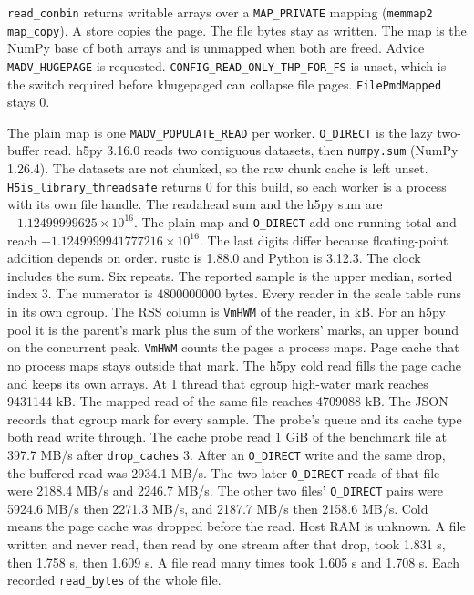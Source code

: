 \texttt{read\_conbin} returns writable arrays over a
\texttt{MAP\_PRIVATE} mapping (\texttt{memmap2} \texttt{map\_copy}).
A store copies the page.
The file bytes stay as written.
The map is the NumPy base of both arrays and is unmapped when both are
freed.
Advice \texttt{MADV\_HUGEPAGE} is requested.
\texttt{CONFIG\_READ\_ONLY\_THP\_FOR\_FS} is unset, which is the switch required before
khugepaged can collapse file pages.
\texttt{FilePmdMapped} stays 0.

The plain map is one \texttt{MADV\_POPULATE\_READ} per worker.
\texttt{O\_DIRECT} is the lazy two-buffer read.
h5py 3.16.0 reads two contiguous datasets, then \texttt{numpy.sum}
(NumPy 1.26.4).
The datasets are not chunked, so the raw chunk cache is left unset.
\texttt{H5is\_library\_threadsafe} returns 0 for this build, so each
worker is a process with its own file handle.
The readahead sum and the h5py sum are
\(-1.12499999625 \times 10^{16}\).
The plain map and \texttt{O\_DIRECT} add one running total and reach
\(-1.1249999941777216 \times 10^{16}\).
The last digits differ because floating-point addition depends on order.
rustc is 1.88.0 and Python is 3.12.3.
The clock includes the sum.
Six repeats.
The reported sample is the upper median, sorted index 3.
The numerator is \(4800000000\) bytes.
Every reader in the scale table runs in its own cgroup.
The RSS column is \texttt{VmHWM} of the reader, in kB.
For an h5py pool it is the parent's mark plus the sum of the workers'
marks, an upper bound on the concurrent peak.
\texttt{VmHWM} counts the pages a process maps.
Page cache that no process maps stays outside that mark.
The h5py cold read fills the page cache and keeps its own arrays.
At 1 thread that cgroup high-water mark reaches 9431144 kB.
The mapped read of the same file reaches 4709088 kB.
The JSON records that cgroup mark for every sample.
The probe's queue and its cache type both read write through.
The cache probe read 1 GiB of the benchmark file at 397.7 MB/s after
\texttt{drop\_caches} 3.
After an \texttt{O\_DIRECT} write and the same drop, the buffered read
was 2934.1 MB/s.
The two later \texttt{O\_DIRECT} reads of that file were 2188.4
MB/s and 2246.7 MB/s.
The other two files' \texttt{O\_DIRECT} pairs were 5924.6
MB/s then 2271.3 MB/s, and 2187.7 MB/s then 2158.6 MB/s.
Cold means the page cache was dropped before the read. Host RAM is unknown.
A file written and never read, then read by one stream after that drop,
took 1.831 s, then 1.758 s, then 1.609 s.
A file read many times took 1.605 s and 1.708 s.
Each recorded \texttt{read\_bytes} of the whole file.
